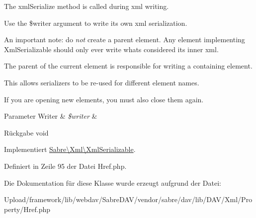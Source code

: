 The xml\+Serialize method is called during xml writing.

Use the \$writer argument to write its own xml serialization.

An important note\+: do {\itshape not} create a parent element. Any element implementing Xml\+Serializable should only ever write what\textquotesingle{}s considered its \textquotesingle{}inner xml\textquotesingle{}.

The parent of the current element is responsible for writing a containing element.

This allows serializers to be re-\/used for different element names.

If you are opening new elements, you must also close them again.


\begin{DoxyParams}[1]{Parameter}
Writer & {\em \$writer} & \\
\hline
\end{DoxyParams}
\begin{DoxyReturn}{Rückgabe}
void 
\end{DoxyReturn}


Implementiert \mbox{\hyperlink{interface_sabre_1_1_xml_1_1_xml_serializable_aa78f3ee43aa699be8347181653a53d8c}{Sabre\textbackslash{}\+Xml\textbackslash{}\+Xml\+Serializable}}.



Definiert in Zeile 95 der Datei Href.\+php.



Die Dokumentation für diese Klasse wurde erzeugt aufgrund der Datei\+:\begin{DoxyCompactItemize}
\item 
Upload/framework/lib/webdav/\+Sabre\+D\+A\+V/vendor/sabre/dav/lib/\+D\+A\+V/\+Xml/\+Property/Href.\+php\end{DoxyCompactItemize}
